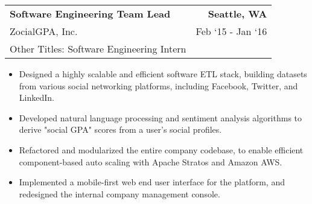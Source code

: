\documentclass[10pt, letterpaper]{article}
\newcommand{\tabularxwidth}{\textwidth}
\begin{document}
    \begin{minipage}{\tabularxwidth}

        \begin{tabularx}{\tabularxwidth}{X r}
            \textbf{Software Engineering Team Lead} & \textbf{Seattle, 
        WA} \\
            ZocialGPA, Inc. & 
        
    Feb ‘15 - 
    Jan ‘16 \\
            
            
                Other Titles: Software Engineering Intern & \\
            
        \end{tabularx}

        \begin{itemize}[noitemsep, topsep=3pt, parsep=0pt, partopsep=0pt]
            
                \item 
    Designed a highly scalable and efficient software ETL stack, building datasets from various social networking platforms, including Facebook, Twitter, and LinkedIn.
            
                \item 
    Developed natural language processing and sentiment analysis algorithms to derive "social GPA" scores from a user's social profiles.
            
                \item 
    Refactored and modularized the entire company codebase, to enable efficient component-based auto scaling with Apache Stratos and Amazon AWS.
            
                \item 
    Implemented a mobile-first web end user interface for the platform, and redesigned the internal company management console.
            
        \end{itemize}

        
            \vspace{.5em}
        

    \end{minipage}
    
\end{document}
